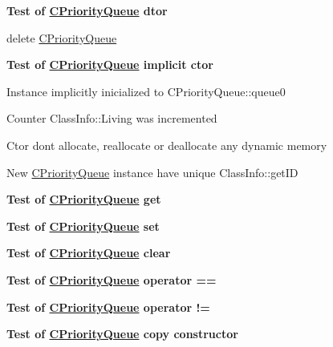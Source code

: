 
\begin{DoxyRefList}
\item[Member \mbox{\hyperlink{namespace_unit_tests_a10cebd70ea74b7085e95c98cfa2798c4}{Unit\+Tests\+::T\+E\+S\+T\+\_\+\+C\+L\+A\+SS}} (C\+Priority\+Queue\+Functional\+Tests)]\label{test__test000001}%
%
{\bfseries{Test of \mbox{\hyperlink{class_c_priority_queue}{C\+Priority\+Queue}} d\textquotesingle{}tor}}
\begin{DoxyItemize}
\item delete \mbox{\hyperlink{class_c_priority_queue}{C\+Priority\+Queue}} 
\end{DoxyItemize}

\label{test__test000002}%
%
{\bfseries{Test of \mbox{\hyperlink{class_c_priority_queue}{C\+Priority\+Queue}} implicit c\textquotesingle{}tor}}
\begin{DoxyItemize}
\item Instance implicitly inicialized to {\ttfamily C\+Priority\+Queue\+::queue0}
\item Counter {\ttfamily Class\+Info\+::\+Living} was incremented
\item C\textquotesingle{}tor don\textquotesingle{}t allocate, reallocate or deallocate any dynamic memory
\item New \mbox{\hyperlink{class_c_priority_queue}{C\+Priority\+Queue}} instance have unique {\ttfamily Class\+Info\+::get\+ID} 
\end{DoxyItemize}

\label{test__test000003}%
%
{\bfseries{Test of \mbox{\hyperlink{class_c_priority_queue}{C\+Priority\+Queue}} get}} 

\label{test__test000004}%
%
{\bfseries{Test of \mbox{\hyperlink{class_c_priority_queue}{C\+Priority\+Queue}} set}} 

\label{test__test000005}%
%
{\bfseries{Test of \mbox{\hyperlink{class_c_priority_queue}{C\+Priority\+Queue}} clear}} 

\label{test__test000006}%
%
{\bfseries{Test of \mbox{\hyperlink{class_c_priority_queue}{C\+Priority\+Queue}} operator ==}} 

\label{test__test000007}%
%
{\bfseries{Test of \mbox{\hyperlink{class_c_priority_queue}{C\+Priority\+Queue}} operator !=}} 

\label{test__test000008}%
%
{\bfseries{Test of \mbox{\hyperlink{class_c_priority_queue}{C\+Priority\+Queue}} copy constructor}} 


\end{DoxyRefList}
